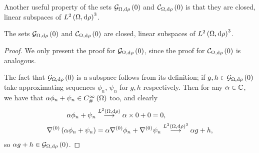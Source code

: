 Another useful property of the sets $\mathcal{G}_{ \Omega, \mathrm{d}\rho}\left( 0 \right)$ and $\mathcal{C}_{ \Omega, \mathrm{d}\rho}\left( 0 \right)$ is that they are closed, linear subspaces of $L^{2}\left( \Omega,\mathrm{d} \rho \right)^3$.
\begin{prop}
	The sets $\mathcal{G}_{ \Omega, \mathrm{d}\rho}\left( 0 \right)$ and $\mathcal{C}_{ \Omega, \mathrm{d}\rho}\left( 0 \right)$ are closed, linear subspaces of $L^{2}\left( \Omega,\mathrm{d} \rho \right)^3$.
\end{prop}
\begin{proof}
	We only present the proof for $\mathcal{G}_{ \Omega, \mathrm{d}\rho}\left( 0 \right)$, since the proof for $\mathcal{C}_{ \Omega, \mathrm{d}\rho}\left( 0 \right)$ is analogous.
	
	The fact that $\mathcal{G}_{ \Omega, \mathrm{d}\rho}\left( 0 \right)$ is a subspace follows from its definition; if $g, h\in\mathcal{G}_{ \Omega, \mathrm{d}\rho}\left( 0 \right)$ take approximating sequences $\phi_n$, $\psi_n$ for $g,h$ respectively.
	Then for any $\alpha\in\mathbb{C}$, we have that $\alpha\phi_n + \psi_n\in C^{\infty}_{\#}\left( \Omega \right)$ too, and clearly
	\begin{align*}
		\alpha\phi_n + \psi_n &\overset{L^{2}\left( \Omega,\mathrm{d} \rho \right)}{\longrightarrow} \alpha\times 0 + 0 = 0, \\
		\nabla^{(0)}\left( \alpha\phi_n + \psi_n \right) &= \alpha\nabla^{(0)}\phi_n + \nabla^{(0)}\psi_n
		\overset{L^{2}\left( \Omega,\mathrm{d} \rho \right)^3}{\longrightarrow} \alpha g + h,
	\end{align*}
	so $\alpha g + h\in\mathcal{G}_{ \Omega, \mathrm{d}\rho}\left( 0 \right)$.
	

\end{proof}
